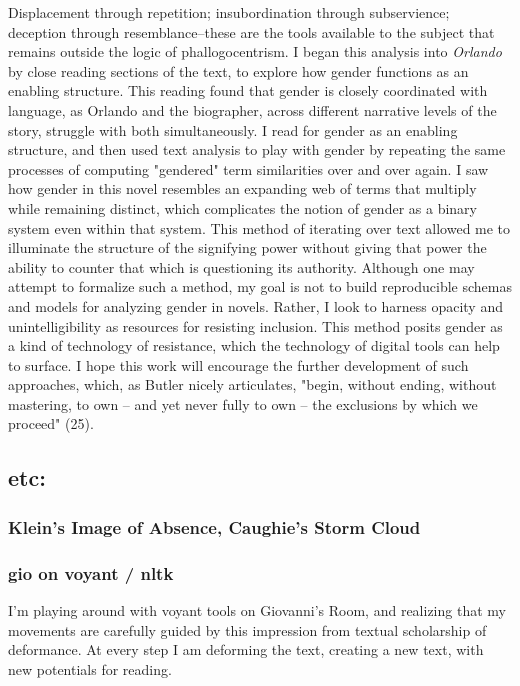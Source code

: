 \documentclass[11pt]{article}
\begin{document}
Displacement through repetition; insubordination through subservience;
deception through resemblance--these are the tools available to the
subject that remains outside the logic of phallogocentrism. I began
this analysis into \emph{Orlando} by close reading sections of the text, to
explore how gender functions as an enabling structure. This reading
found that gender is closely coordinated with language, as Orlando and
the biographer, across different narrative levels of the story,
struggle with both simultaneously. I read for gender as an enabling
structure, and then used text analysis to play with gender by
repeating the same processes of computing "gendered" term similarities
over and over again. I saw how gender in this novel resembles an
expanding web of terms that multiply while remaining distinct, which
complicates the notion of gender as a binary system even within that
system. This method of iterating over text allowed me to illuminate
the structure of the signifying power without giving that power the
ability to counter that which is questioning its authority. Although
one may attempt to formalize such a method, my goal is not to build
reproducible schemas and models for analyzing gender in
novels. Rather, I look to harness opacity and unintelligibility as
resources for resisting inclusion. This method posits gender as a kind
of technology of resistance, which the technology of digital tools can
help to surface. I hope this work will encourage the further
development of such approaches, which, as Butler nicely articulates,
"begin, without ending, without mastering, to own – and yet never
fully to own – the exclusions by which we proceed" (25).


\subsection{etc:}
\label{sec:orga7314b2}
\subsubsection{Klein's Image of Absence, Caughie's Storm Cloud}
\label{sec:org9250f7e}
\subsubsection{gio on voyant / nltk}
\label{sec:orgc10d139}
    I'm playing around with voyant tools on Giovanni's Room, and realizing
that my movements are carefully guided by this impression from textual
scholarship of deformance. At every step I am deforming the text,
creating a new text, with new potentials for reading. 
\end{document}
